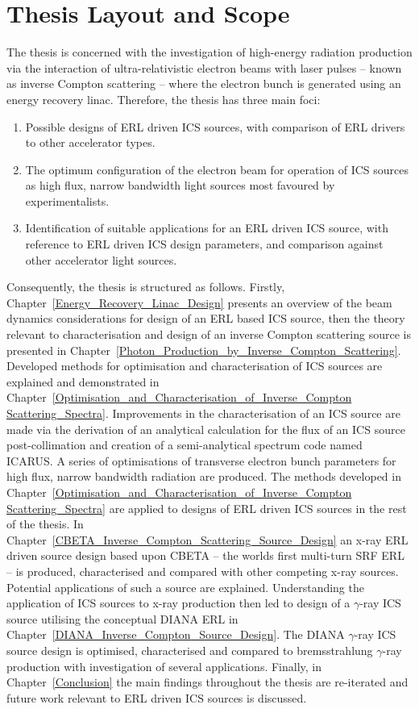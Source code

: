 \documentclass[../main.tex]{subfiles}
\begin{document}
\section{Thesis Layout and Scope}
\label{sec:thesis_layout_scope}

The thesis is concerned with the investigation of high-energy radiation production via the interaction of ultra-relativistic electron beams with laser pulses -- known as inverse Compton scattering -- where the electron bunch is generated using an energy recovery linac. Therefore, the thesis has three main foci: 
\begin{enumerate}
    \item{Possible designs of ERL driven ICS sources, with comparison of ERL drivers to other accelerator types.}
    \item{The optimum configuration of the electron beam for operation of ICS sources as high flux, narrow bandwidth light sources most favoured by experimentalists.}
    \item{Identification of suitable applications for an ERL driven ICS source, with reference to ERL driven ICS design parameters, and comparison against other accelerator light sources.}
\end{enumerate}

Consequently, the thesis is structured as follows. Firstly,  Chapter~\ref{Energy_Recovery_Linac_Design} presents an overview of the beam dynamics considerations for design of an ERL based ICS source, then the theory relevant to characterisation and design of an inverse Compton scattering source is presented in Chapter~\ref{Photon_Production_by_Inverse_Compton_Scattering}. Developed methods for optimisation and characterisation of ICS sources are explained and demonstrated in Chapter~\ref{Optimisation_and_Characterisation_of_Inverse_Compton Scattering_Spectra}. Improvements in the characterisation of an ICS source are made via the derivation of an analytical calculation for the flux of an ICS source post-collimation and creation of a semi-analytical spectrum code named \textsc{ICARUS}. A series of optimisations of transverse electron bunch parameters for high flux, narrow bandwidth radiation are produced. The methods developed in Chapter~\ref{Optimisation_and_Characterisation_of_Inverse_Compton Scattering_Spectra} are applied to designs of ERL driven ICS sources in the rest of the thesis. In Chapter~\ref{CBETA_Inverse_Compton_Scattering_Source_Design} an x-ray ERL driven source design based upon CBETA -- the worlds first multi-turn SRF ERL -- is produced, characterised and compared with other competing x-ray sources. Potential applications of such a source are explained. Understanding the application of ICS sources to x-ray production then led to design of a $\gamma$-ray ICS source utilising the conceptual DIANA ERL in Chapter~\ref{DIANA_Inverse_Compton_Source_Design}. The DIANA $\gamma$-ray ICS source design is optimised, characterised and compared to bremsstrahlung $\gamma$-ray production with investigation of several applications. Finally, in Chapter~\ref{Conclusion} the main findings throughout the thesis are re-iterated and future work relevant to ERL driven ICS sources is discussed.       
\end{document}
